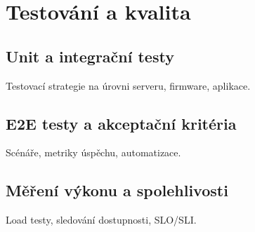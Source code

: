 \chapter{Testování a kvalita}
\label{chap:testovani}

\section{Unit a integrační testy}
Testovací strategie na úrovni serveru, firmware, aplikace.

\section{E2E testy a akceptační kritéria}
Scénáře, metriky úspěchu, automatizace.

\section{Měření výkonu a spolehlivosti}
Load testy, sledování dostupnosti, SLO/SLI.
